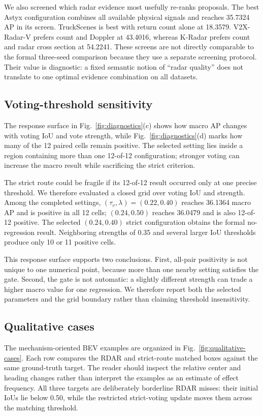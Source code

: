 \documentclass[preprint,12pt,times]{elsarticle}
\newcommand{\figref}[1]{\textcolor{floatreviewblue}{Fig.~\ref{#1}}}
\newcommand{\figref}[1]{Fig.~\ref{#1}}
\begin{document}
We also screened which radar evidence most usefully re-ranks proposals. The
best Astyx configuration combines all available physical signals and reaches
35.7324 AP in its screen. TruckScenes is best with return count alone at
18.3579. V2X-Radar-V prefers count and Doppler at 43.4016, whereas K-Radar
prefers count and radar cross section at 54.2241. These screens are not
directly comparable to the formal three-seed comparison because they use a separate
screening protocol. Their value is diagnostic: a fixed semantic notion of
``radar quality'' does not translate to one optimal evidence combination on
all datasets.

\subsection{Voting-threshold sensitivity}

The response surface in \figref{fig:diagnostics}(c) shows how macro AP changes
with voting IoU and vote strength, while \figref{fig:diagnostics}(d) marks how
many of the 12 paired cells remain positive. The selected setting lies inside
a region containing more than one 12-of-12 configuration; stronger voting can
increase the macro result while sacrificing the strict criterion.

The strict route could be fragile if its 12-of-12 result occurred only at one
precise threshold. We therefore evaluated a closed grid over voting IoU and
strength. Among the completed settings, $(\tau_v,\lambda)=(0.22,0.40)$ reaches
36.1364 macro AP and is positive in all 12 cells; $(0.24,0.50)$ reaches
36.0479 and is also 12-of-12 positive. The selected $(0.24,0.40)$ strict
configuration obtains the formal no-regression result. Neighboring
strengths of 0.35 and several larger IoU thresholds produce only 10 or 11
positive cells.

This response surface supports two conclusions. First, all-pair positivity is
not unique to one numerical point, because more than one nearby setting
satisfies the gate. Second, the gate is not automatic: a slightly different
strength can trade a higher macro value for one regression. We therefore
report both the selected parameters and the grid boundary rather than claiming
threshold insensitivity.

\subsection{Qualitative cases}

The mechanism-oriented BEV examples are organized in
\figref{fig:qualitative-cases}. Each row compares the RDAR and strict-route
matched boxes against the same ground-truth target. The reader should inspect
the relative center and heading changes rather than interpret the examples as
an estimate of effect frequency. All three targets are deliberately
borderline RDAR misses: their initial IoUs lie below 0.50, while the restricted
strict-voting update moves them across the matching threshold.
\end{document}
